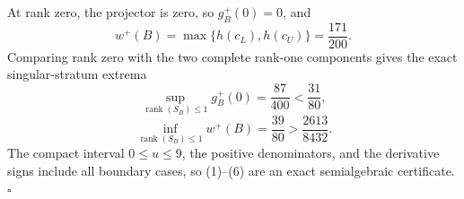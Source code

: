 At rank zero, the projector is zero, so \(g_B^+(0)=0\), and
\[
w^+(B)=\max\{h(c_L),h(c_U)\}=\frac{171}{200}.
\]
Comparing rank zero with the two complete rank-one components gives the exact singular-stratum extrema
\[
\sup_{\operatorname{rank}(S_B)\le1}g_B^+(0)
=\frac{87}{400}<\frac{31}{80},
\]
\[
\inf_{\operatorname{rank}(S_B)\le1}w^+(B)
=\frac{39}{80}>\frac{2613}{8432}.
\]
The compact interval \(0\le u\le9\), the positive denominators, and the derivative signs include all boundary cases, so (1)--(6) are an exact semialgebraic certificate. \(\square\)
